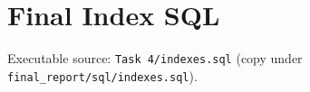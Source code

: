 \section{Final Index SQL}
\label{app:indexes}

Executable source: \texttt{Task 4/indexes.sql} (copy under \texttt{final\_report/sql/indexes.sql}).


